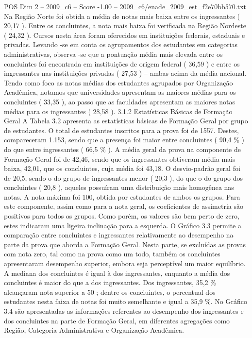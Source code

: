 \begin{textsample}{POS Dim 2 – 2009\_c6 – Score -1.00 – 2009\_c6/enade\_2009\_est\_f2e70bb570.txt}
Na Região Norte foi obtida a média de notas mais baixa entre os ingressantes ( 20,17 ).
Entre os concluintes, a nota mais baixa foi verificada na Região Nordeste ( 24,32 ).
Cursos nesta área foram oferecidos em instituições federais, estaduais e privadas.
Levando -se em conta os agrupamentos dos estudantes em categorias administrativas, observa -se que a pontuação média mais elevada entre os concluintes foi encontrada em instituições de origem federal ( 36,59 ) e entre os ingressantes nas instituições privadas ( 27,53 ) – ambas acima da média nacional.
Tendo como foco as notas médias dos estudantes agrupados por Organização Acadêmica, notamos que universidades apresentam as maiores médias para os concluintes ( 33,35 ), ao passo que as faculdades apresentam as maiores notas médias para os ingressantes ( 28,58 ). 3.1.2 Estatísticas Básicas de Formação Geral A Tabela 3.2 apresenta as estatísticas básicas de Formação Geral por grupo de estudantes.
O total de estudantes inscritos para a prova foi de 1557.
Destes, compareceram 1.153, sendo que a presença foi maior entre concluintes ( 90,4 \% ) do que entre ingressantes ( 66,5 \% ).
A média geral da prova na componente de Formação Geral foi de 42,46, sendo que os ingressantes obtiveram média mais baixa, 42,01, que os concluintes, cuja média foi 43,18.
O desvio-padrão geral foi de 20,5, sendo o do grupo de ingressantes menor ( 20,3 ), do que o do grupo dos concluintes ( 20,8 ), aqueles possuíram uma distribuição mais homogênea nas notas.
A nota máxima foi 100, obtida por estudantes de ambos os grupos.
Para este componente, assim como para a nota geral, os coeficientes de assimetria são positivos para todos os grupos.
Como porém, os valores são bem perto de zero, estes indicaram uma ligeira inclinação para a esquerda.
O Gráfico 3.3 permite a comparação entre concluintes e ingressantes relativamente ao desempenho na parte da prova que aborda a Formação Geral.
Nesta parte, se excluídas as provas com nota zero, tal como na prova como um todo, também os concluintes apresentaram desempenho superior, embora seja perceptível um maior equilíbrio.
A mediana dos concluintes é igual à dos ingressantes, enquanto a média dos concluintes é maior do que a dos ingressantes.
Dos ingressantes, 35,2 \% alcançaram nota superior a 50 ; dentre os concluintes, o percentual dos estudantes nesta faixa de notas foi muito semelhante e igual a 35,9 \%.
No Gráfico 3.4 são apresentadas as informações referentes ao desempenho dos ingressantes e dos concluintes na parte de Formação Geral, em diferentes agregações como Região, Categoria Administrativa e Organização Acadêmica.

\end{textsample}
